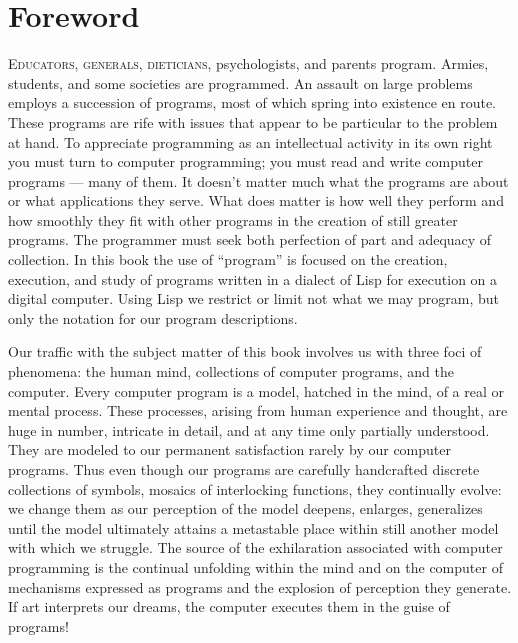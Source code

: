 \chapter*{Foreword}
\label{Foreword}


\lettrine{E}{ducators, generals, dieticians}, psychologists, and parents program.
Ar\-mies, students, and some societies are programmed. An assault on large problems
employs a succession of programs, most of which spring into existence en route.
These programs are rife with issues that appear to be particular to the problem
at hand. To appreciate programming as an intellectual activity in its own
right you must turn to computer programming; you must read and write computer
programs --- many of them. It doesn't matter much what the programs are about or
what applications they serve. What does matter is how well they perform and
how smoothly they fit with other programs in the creation of still greater
programs. The programmer must seek both perfection of part and adequacy of
collection. In this book the use of ``program'' is focused on the creation,
execution, and study of programs written in a dialect of Lisp for execution on
a digital computer. Using Lisp we restrict or limit not what we may program,
but only the notation for our program descriptions.

Our traffic with the subject matter of this book involves us with three foci of
phenomena: the human mind, collections of computer programs, and the computer.
Every computer program is a model, hatched in the mind, of a real or mental
process.  These processes, arising from human experience and thought, are huge
in number, intricate in detail, and at any time only partially understood.
They are modeled to our permanent satisfaction rarely by our computer programs.
Thus even though our programs are carefully handcrafted discrete collections of
symbols, mosaics of interlocking functions, they continually evolve: we change
them as our perception of the model deepens, enlarges, generalizes until the
model ultimately attains a metastable place within still another model with
which we struggle.  The source of the exhilaration associated with computer
programming is the continual unfolding within the mind and on the computer of
mechanisms expressed as programs and the explosion of perception they generate.
If art interprets our dreams, the computer executes them in the guise of
programs!

